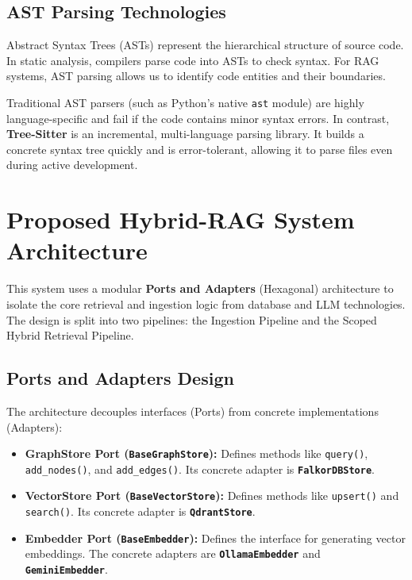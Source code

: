 \documentclass[12pt,a4paper,oneside]{report}
\begin{document}
\section{AST Parsing Technologies}
Abstract Syntax Trees (ASTs) represent the hierarchical structure of source code. In static analysis, compilers parse code into ASTs to check syntax. For RAG systems, AST parsing allows us to identify code entities and their boundaries.

Traditional AST parsers (such as Python's native \texttt{ast} module) are highly language-specific and fail if the code contains minor syntax errors. In contrast, \textbf{Tree-Sitter} is an incremental, multi-language parsing library. It builds a concrete syntax tree quickly and is error-tolerant, allowing it to parse files even during active development.

\newpage

\chapter{Proposed Hybrid-RAG System Architecture}

This system uses a modular \textbf{Ports and Adapters} (Hexagonal) architecture to isolate the core retrieval and ingestion logic from database and LLM technologies. The design is split into two pipelines: the Ingestion Pipeline and the Scoped Hybrid Retrieval Pipeline.

\section{Ports and Adapters Design}
The architecture decouples interfaces (Ports) from concrete implementations (Adapters):
\begin{itemize}
    \item \textbf{GraphStore Port (\texttt{BaseGraphStore}):} Defines methods like \texttt{query()}, \texttt{add\_nodes()}, and \texttt{add\_edges()}. Its concrete adapter is \textbf{\texttt{FalkorDBStore}}.
    \item \textbf{VectorStore Port (\texttt{BaseVectorStore}):} Defines methods like \texttt{upsert()} and \texttt{search()}. Its concrete adapter is \textbf{\texttt{QdrantStore}}.
    \item \textbf{Embedder Port (\texttt{BaseEmbedder}):} Defines the interface for generating vector embeddings. The concrete adapters are \textbf{\texttt{OllamaEmbedder}} and \textbf{\texttt{GeminiEmbedder}}.
\end{itemize}
\end{document}
